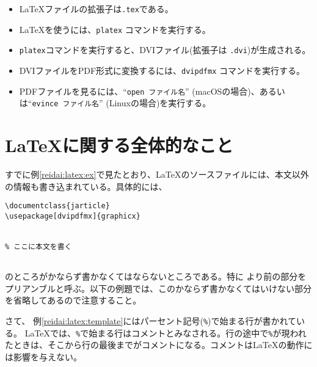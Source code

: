 \begin{itemize}
\item \LaTeX ファイルの拡張子は\texttt{.tex}である。
\item \LaTeX を使うには、\verb|platex| コマンドを実行する。
\item \texttt{platex}コマンドを実行すると、DVIファイル(拡張子は \texttt{.dvi})が生成される。
\item DVIファイルをPDF形式に変換するには、\verb|dvipdfmx| コマンドを実行する。
\item PDFファイルを見るには、``\verb|open ファイル名|'' (macOSの場合)、あるいは``\verb|evince ファイル名|'' (Linuxの場合)を実行する。
\end{itemize}

\section{\LaTeX に関する全体的なこと}
\label{sec:latex:global}

すでに例\ref{reidai:latex:ex}で見たとおり、\LaTeX のソースファイルには、本文以外の情報も書き込まれている。具体的には、
\begin{reidai}
\label{reidai:latex:template}
\begin{verbatim}
\documentclass{jarticle}
\usepackage[dvipdfmx]{graphicx}


% ここに本文を書く


\end{verbatim}
\end{reidai} \noindent
のところがかならず書かなくてはならないところである。特に \verb||より前の部分をプリアンブルと呼ぶ。以下の例題では、このかならず書かなくてはいけない部分を省略してあるので注意すること。

さて、 例\ref{reidai:latex:template}にはパーセント記号(\texttt{\%})で始まる行が書かれている。 \LaTeX では、\texttt{\%}で始まる行はコメントとみなされる。行の途中で\texttt{\%}が現われたときは、そこから行の最後までがコメントになる。コメントは\LaTeX の動作には影響を与えない。

